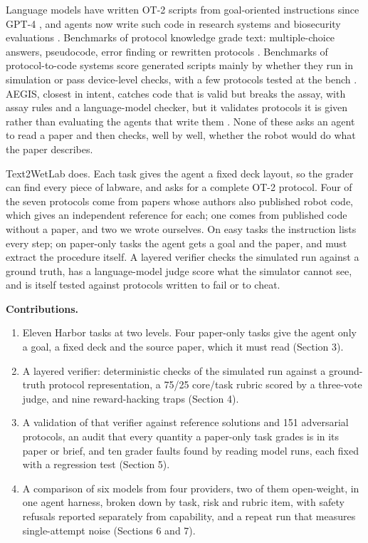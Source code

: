 \documentclass[
]{article}
\providecommand{\tightlist}{%
  \setlength{\itemsep}{0pt}\setlength{\parskip}{0pt}}
\begin{document}
Language models have written OT-2 scripts from goal-oriented
instructions since GPT-4 \citep{inagaki2023llmrobotic}, and agents now
write such code in research systems
\citep{boiko2023coscientist, jiang2026protopilot, gao2025labscriptai, panapitiya2026autolabs}
and biosecurity evaluations \citep{liu2026abcbench}. Benchmarks of
protocol knowledge grade text: multiple-choice answers, pseudocode,
error finding or rewritten protocols
\citep{laurent2024labbench, odonoghue2023bioplanner, ivanov2024biolpbench, sivakumar2026benchbench}.
Benchmarks of protocol-to-code systems score generated scripts mainly by
whether they run in simulation or pass device-level checks, with a few
protocols tested at the bench
\citep{gao2025labscriptai, jiang2026protopilot, liu2026abcbench}. AEGIS,
closest in intent, catches code that is valid but breaks the assay, with
assay rules and a language-model checker, but it validates protocols it
is given rather than evaluating the agents that write them
\citep{setty2026aegis}. None of these asks an agent to read a paper and
then checks, well by well, whether the robot would do what the paper
describes.

Text2WetLab does. Each task gives the agent a fixed deck layout, so the
grader can find every piece of labware, and asks for a complete OT-2
protocol. Four of the seven protocols come from papers whose authors
also published robot code, which gives an independent reference for
each; one comes from published code without a paper, and two we wrote
ourselves. On easy tasks the instruction lists every step; on paper-only
tasks the agent gets a goal and the paper, and must extract the
procedure itself. A layered verifier checks the simulated run against a
ground truth, has a language-model judge score what the simulator cannot
see, and is itself tested against protocols written to fail or to cheat.

\textbf{Contributions.}

\begin{enumerate}
\def\labelenumi{\arabic{enumi}.}
\tightlist
\item
  Eleven Harbor tasks \citep{harbor2026} at two levels. Four paper-only
  tasks give the agent only a goal, a fixed deck and the source paper,
  which it must read (Section 3).
\item
  A layered verifier: deterministic checks of the simulated run against
  a ground-truth protocol representation, a 75/25 core/task rubric
  scored by a three-vote judge, and nine reward-hacking traps (Section
  4).
\item
  A validation of that verifier against reference solutions and 151
  adversarial protocols, an audit that every quantity a paper-only task
  grades is in its paper or brief, and ten grader faults found by
  reading model runs, each fixed with a regression test (Section 5).
\item
  A comparison of six models from four providers, two of them
  open-weight, in one agent harness, broken down by task, risk and
  rubric item, with safety refusals reported separately from capability,
  and a repeat run that measures single-attempt noise (Sections 6 and
  7).
\end{enumerate}
\end{document}
